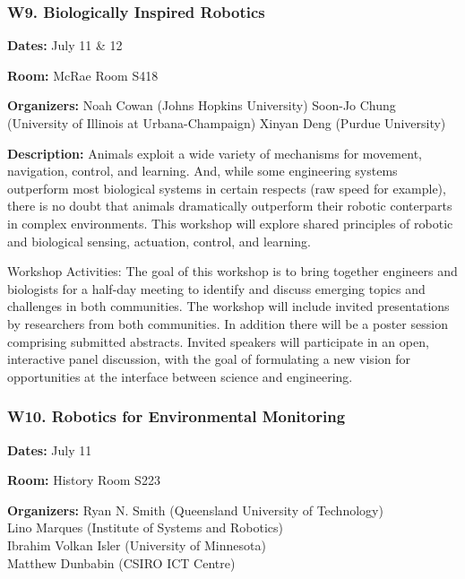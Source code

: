 \subsubsection*{ W9.   Biologically Inspired Robotics}

{\bf Dates:} July 11 \& 12

{\bf Room:} McRae Room S418

\bigskip
{\bf Organizers:}
Noah Cowan (Johns Hopkins University)
Soon-Jo Chung (University of Illinois at Urbana-Champaign)
Xinyan Deng (Purdue University)

\bigskip
{\bf Description:}
Animals exploit a wide variety of mechanisms for movement, navigation, control, and learning. And, while some engineering systems outperform most biological systems in certain respects (raw speed for example), there is no doubt that animals dramatically outperform their robotic conterparts in complex environments. This workshop will explore shared principles of robotic and biological sensing, actuation, control, and learning. 

Workshop Activities: The goal of this workshop is to bring together engineers and biologists for a half-day meeting to identify and discuss emerging topics and challenges in both communities. The workshop will include invited presentations by researchers from both communities. In addition there will be a poster session comprising submitted abstracts. Invited speakers will participate in an open, interactive panel discussion, with the goal of formulating a new vision for opportunities at the interface between science and engineering.

\subsubsection*{ W10.   Robotics for Environmental Monitoring}

{\bf Dates:} July 11

{\bf Room:} History Room S223

\bigskip
{\bf Organizers:}
Ryan N. Smith (Queensland University of Technology)\\
Lino Marques (Institute of Systems and Robotics)\\
Ibrahim Volkan Isler (University of Minnesota)\\
Matthew Dunbabin (CSIRO ICT Centre)

